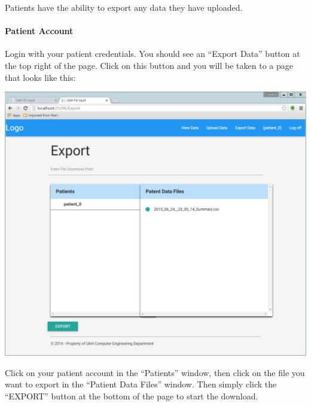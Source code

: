 \documentclass[letterpaper,10pt,english]{sphinxmanual}
\begin{document}
Patients have the ability to export any data they have uploaded.


\paragraph{Patient Account}
\label{user_guide/patient_data_download:patient-account}
Login with your patient credentials. You should see an ``Export Data'' button at the top right of the page. Click on this
button and you will be taken to a page that looks like this:

\includegraphics{export_data.png}

Click on your patient account in the ``Patients'' window, then click on the file you want to export in the ``Patient
Data Files'' window. Then simply click the ``EXPORT'' button at the bottom of the page to start the download.
\end{document}
